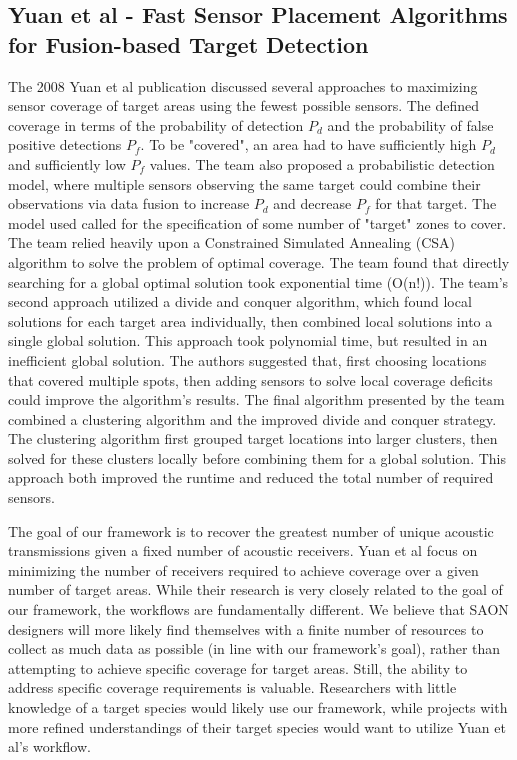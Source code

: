 \subsection{Yuan et al - Fast Sensor Placement Algorithms for Fusion-based Target Detection}
The 2008 Yuan et al publication discussed several approaches to maximizing sensor coverage of target areas using the fewest possible sensors.  The defined coverage in terms of the probability of detection $P_d$ and the probability of false positive detections $P_f$.  To be "covered", an area had to have sufficiently high $P_d$ and sufficiently low $P_f$ values.  The team also proposed a probabilistic detection model, where multiple sensors observing the same target could combine their observations via  data fusion to increase $P_d$ and decrease $P_f$ for that target. The model used called for the specification of some number of "target" zones to cover.  The team relied heavily upon a Constrained Simulated Annealing (CSA) algorithm to solve the problem of optimal coverage.  The team found that directly searching for a global optimal solution took exponential time (O(n!)).  The team's second approach utilized a divide and conquer algorithm, which found local solutions for each target area individually, then combined local solutions into a single global solution.  This approach took polynomial time, but resulted in an inefficient global solution.  The authors suggested that, first choosing locations that covered multiple spots, then adding sensors to solve local coverage deficits could improve the algorithm's results.  The final algorithm presented by the team combined a clustering algorithm and the improved divide and conquer strategy.  The clustering algorithm first grouped target locations into larger clusters, then solved for these clusters locally before combining them for a global solution.  This approach both improved the runtime and reduced the total number of required sensors.

The goal of our framework is to recover the greatest number of unique acoustic transmissions given a fixed number of acoustic receivers.  Yuan et al focus on minimizing the number of receivers required to achieve coverage over a given number of target areas.  While their research is very closely related to the goal of our framework, the workflows are fundamentally different.  We believe that SAON designers will more likely find themselves with a finite number of resources to collect as much data as possible (in line with our framework's goal), rather than attempting to achieve specific coverage for target areas.  Still, the ability to address specific coverage requirements is valuable.  Researchers with little knowledge of a target species would likely use our framework, while projects with more refined understandings of their target species would want to utilize Yuan et al's workflow.  


